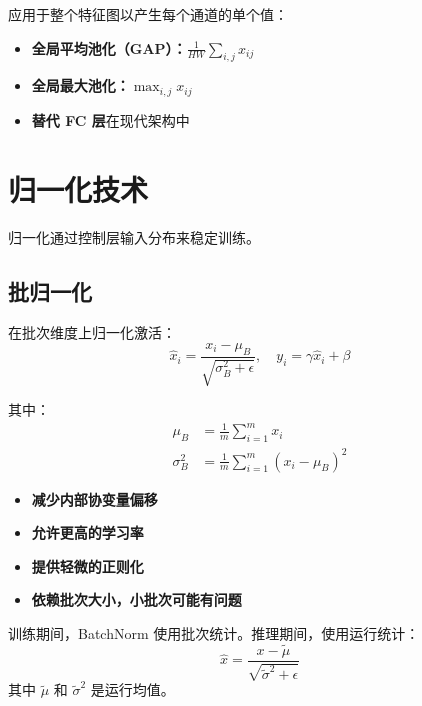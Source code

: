 应用于整个特征图以产生每个通道的单个值：
\begin{itemize}
    \item \textbf{全局平均池化（GAP）：}$\frac{1}{HW}\sum_{i,j} x_{ij}$
    \item \textbf{全局最大池化：}$\max_{i,j} x_{ij}$
    \item \textbf{替代 FC 层}在现代架构中
\end{itemize}

\section{归一化技术}

归一化通过控制层输入分布来稳定训练。

\subsection{批归一化}

在批次维度上归一化激活：
\begin{equation}
\hat{x}_i = \frac{x_i - \mu_B}{\sqrt{\sigma_B^2 + \epsilon}}, \quad y_i = \gamma \hat{x}_i + \beta
\end{equation}

其中：
\begin{align}
\mu_B &= \frac{1}{m}\sum_{i=1}^{m} x_i \\
\sigma_B^2 &= \frac{1}{m}\sum_{i=1}^{m}(x_i - \mu_B)^2
\end{align}

\begin{properties}[BatchNorm特性]
\begin{itemize}
    \item \textbf{减少内部协变量偏移}
    \item \textbf{允许更高的学习率}
    \item \textbf{提供轻微的正则化}
    \item \textbf{依赖批次大小，小批次可能有问题}
\end{itemize}
\end{properties}

\begin{note}[BatchNorm vs 推理]
训练期间，BatchNorm 使用批次统计。推理期间，使用运行统计：
\begin{equation}
\hat{x} = \frac{x - \tilde{\mu}}{\sqrt{\tilde{\sigma}^2 + \epsilon}}
\end{equation}
其中 $\tilde{\mu}$ 和 $\tilde{\sigma}^2$ 是运行均值。
\end{note}

